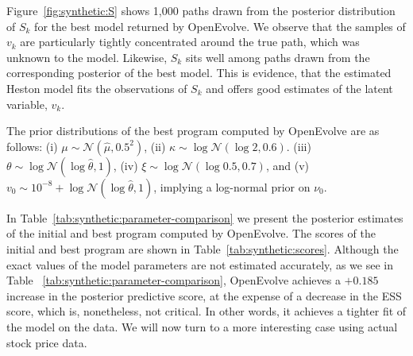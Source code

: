 \documentclass[11pt]{report}
\begin{document}
Figure~\ref{fig:synthetic:S} shows 1,000 paths drawn from the posterior 
distribution of $S_k$ for the best model returned by OpenEvolve. 
We observe that the samples of $v_k$ are particularly tightly concentrated 
around the true path, which was unknown to the model.
Likewise, $S_k$ sits well among paths drawn from the corresponding posterior
of the best model.
This is evidence, that the estimated Heston model fits the observations 
of $S_k$ and offers good estimates of the latent variable, $v_k$.

The prior distributions of the best program computed by 
OpenEvolve are as follows:
(i) $\mu \sim \mathcal{N}(\hat{\mu}, 0.5^2)$,
(ii) $\kappa \sim \log\mathcal{N}(\log 2, 0.6)$. 
(iii) $\theta \sim \log\mathcal{N}(\log \hat{\theta}, 1)$,
(iv) $\xi \sim \log\mathcal{N}(\log 0.5, 0.7)$, 
and 
(v) $v_0 \sim 10^{-8} + \log\mathcal{N}(\log \hat{\theta}, 1)$, 
implying a log-normal prior on $\nu_0$.

In Table~\ref{tab:synthetic:parameter-comparison} 
we present the posterior estimates of the initial and 
best program computed by OpenEvolve.
The scores of the initial and best program are shown 
in Table~\ref{tab:synthetic:scores}.
Although the exact values of the model parameters
are not estimated accurately, as we see in Table 
~\ref{tab:synthetic:parameter-comparison}, 
OpenEvolve achieves a $+0.185$ increase in the 
posterior predictive score, at the expense of a 
decrease in the ESS score, which is, nonetheless,
not critical.
In other words, it achieves a tighter fit of the model 
on the data.
We will now turn to a more interesting case 
using actual stock price data.
\end{document}
